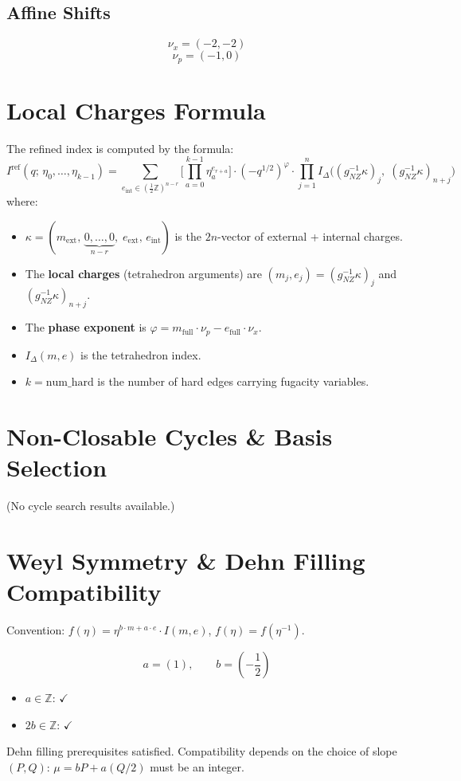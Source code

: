 \documentclass[11pt,a4paper]{article}
\begin{document}
\subsection{Affine Shifts}
$$\nu_x = (-2, -2)$$
$$\nu_p = (-1, 0)$$

\section{Local Charges Formula}
The refined index is computed by the formula:
\begin{equation}
  I^{\text{ref}}(q;\, \eta_0, \ldots, \eta_{k-1})
  = \sum_{e_{\text{int}} \in (\frac{1}{2}\mathbb{Z})^{n-r}}
    \biggl[\prod_{a=0}^{k-1} \eta_a^{e_{r+a}}\biggr]
    \cdot (-q^{1/2})^{\varphi}
    \cdot \prod_{j=1}^{n}
      I_\Delta\bigl((g_{NZ}^{-1}\kappa)_j,\;
                     (g_{NZ}^{-1}\kappa)_{n+j}\bigr)
\end{equation}
where:
\begin{itemize}
  \item $\kappa = (m_{\text{ext}},\, \underbrace{0,\ldots,0}_{n-r},\; e_{\text{ext}},\, e_{\text{int}})$ is the $2n$-vector of external + internal charges.
  \item The \textbf{local charges} (tetrahedron arguments) are $(m_j, e_j) = (g_{NZ}^{-1}\kappa)_j$ and $(g_{NZ}^{-1}\kappa)_{n+j}$.
  \item The \textbf{phase exponent} is $\varphi = m_{\text{full}} \cdot \nu_p - e_{\text{full}} \cdot \nu_x$.
  \item $I_\Delta(m, e)$ is the tetrahedron index.
  \item $k = \text{num\_hard}$ is the number of hard edges carrying fugacity variables.
\end{itemize}

\section{Non-Closable Cycles \& Basis Selection}
(No cycle search results available.)

\section{Weyl Symmetry \& Dehn Filling Compatibility}
Convention: $f(\eta) = \eta^{b\cdot m + a\cdot e} \cdot I(m,e)$, \quad $f(\eta) = f(\eta^{-1})$.

$$a = (1), \qquad b = (-\frac{1}{2})$$

\begin{itemize}
  \item $a \in \mathbb{Z}$: $\checkmark$
  \item $2b \in \mathbb{Z}$: $\checkmark$
\end{itemize}
Dehn filling prerequisites satisfied.  Compatibility depends on the choice of slope $(P, Q)$: $\mu = b P + a (Q/2)$ must be an integer.
\end{document}
